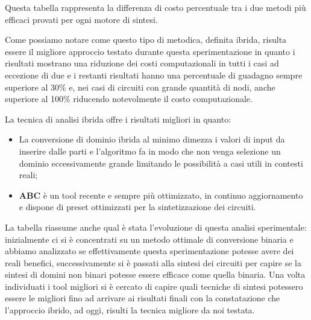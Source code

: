 \documentclass[italian,]{book}
\providecommand{\tightlist}{%
  \setlength{\itemsep}{0pt}\setlength{\parskip}{0pt}}
\begin{document}
\newpage

Questa tabella rappresenta la differenza di costo percentuale tra i due metodi più efficaci provati per ogni motore di sintesi.

Come possiamo notare come questo tipo di metodica, definita ibrida, risulta essere il migliore approccio testato durante questa sperimentazione in quanto i risultati mostrano una riduzione dei costi computazionali in tutti i casi ad eccezione di due e i restanti risultati hanno una percentuale di guadagno sempre superiore al 30\% e, nei casi di circuiti con grande quantità di nodi, anche superiore al 100\% riducendo notevolmente il costo computazionale.

La tecnica di analisi ibrida offre i risultati migliori in quanto:

\begin{itemize}
\tightlist
\item
  La conversione di dominio ibrida al minimo dimezza i valori di input da inserire dalle parti e l'algoritmo fa in modo che non venga selezione un dominio eccessivamente grande limitando le possibilità a casi utili in contesti reali;
\item
  \textbf{ABC} è un tool recente e sempre più ottimizzato, in continuo aggiornamento e dispone di preset ottimizzati per la sintetizzazione dei circuiti.
\end{itemize}

La tabella riassume anche qual è stata l'evoluzione di questa analisi sperimentale: inizialmente ci si è concentrati su un metodo ottimale di conversione binaria e abbiamo analizzato se effettivamente questa sperimentazione potesse avere dei reali benefici, successivamente si è passati alla sintesi dei circuiti per capire se la sintesi di domini non binari potesse essere efficace come quella binaria. Una volta individuati i tool migliori si è cercato di capire quali tecniche di sintesi potessero essere le migliori fino ad arrivare ai risultati finali con la constatazione che l'approccio ibrido, ad oggi, risulti la tecnica migliore da noi testata.


\end{document}
